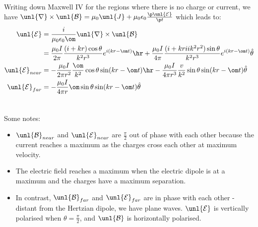 \documentclass[a4paper, 11pt, normalem]{report}
\renewcommand\E{\mathcal{E}}
\newcommand\uE{\unl{\E}}
\renewcommand\B{\mathcal{B}}
\newcommand\uB{\unl{\B}}
\renewcommand\del{\unl{\nabla}}
\newcommand\eno{\epsilon_0}
\newcommand\J{\unl{J}}
\begin{document}
Writing down Maxwell \RN{4} for the regions where there is no charge or current, we have $\del\times\uB = \mu_0\J + \mu_0\eno\frac{\p\uE}{\p t}$ which leads to:
\begin{align}
	\uE &= \frac{i}{\mu_0\eno\om}\del\times\uB \\
	&= \frac{\mu_0I}{2\pi}\frac{(i + kr)\cos\theta}{k^2r^3}e^{i(kr - \om t)}\hr + \frac{\mu_0I}{4\pi}\frac{(i+kriik^2r^2)\sin\theta}{k^2r^3}e^{i(kr - \om t)}\hat{\theta} \\
	\uE_{near} &= -\frac{\mu_0I}{2\pi r^2}\frac{\om}{k^2}\cos\theta\sin(kr - \om t)\hr - \frac{\mu_0I}{4\pi r^3}\frac{v}{k^2}\sin\theta\sin(kr - \om t)\hat{\theta} \\
	\uE_{far} &= -\frac{\mu_0I}{4\pi r}\om\sin\theta\sin(kr - \om t)\hat{\theta}
\end{align}

\chapter{}
Some notes:
\begin{itemize}
	\item $\uB_{near}$ and $\uE_{near}$ are $\frac{\pi}{2}$ out of phase with each other because the current reaches a maximum as the charges cross each other at maximum velocity.
	\item The electric field reaches a maximum when the electric dipole is at a maximum and the charges have a maximum separation.
	\item In contrast, $\uB_{far}$ and $\uE_{far}$ are in phase with each other - distant from the Hertzian dipole, we have plane waves. $\uE$ is vertically polarised when $\theta = \frac{\pi}{2}$, and $\uB$ is horizontally polarised.
\end{itemize}
\end{document}
